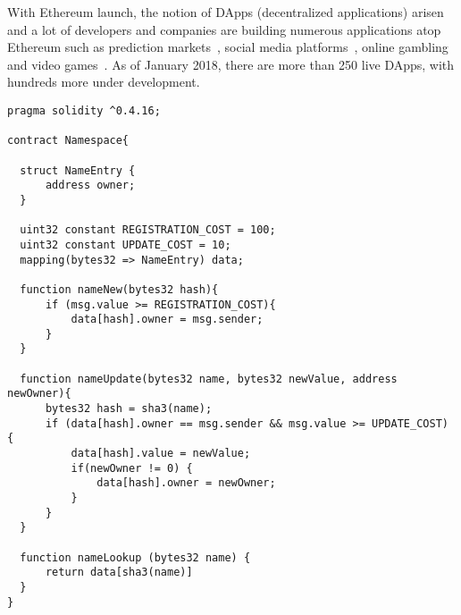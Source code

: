 With Ethereum launch, the notion of DApps (decentralized applications) arisen
and a lot of developers and companies are building numerous applications atop Ethereum such as prediction markets~\cite{augur,gnosis}, social media platforms~\cite{akasha,backfeed},
online gambling~\cite{etheroll,coinpoker} and video games~\cite{cryptokitties}. As of January 2018, there are more than 250 live DApps, with hundreds more under development.

\clearpage

\begin{lstlisting}[language=Solidity, caption={An Ethereum Smart Contract}]
pragma solidity ^0.4.16;

contract Namespace{

  struct NameEntry {
      address owner;
  }

  uint32 constant REGISTRATION_COST = 100;
  uint32 constant UPDATE_COST = 10;
  mapping(bytes32 => NameEntry) data;

  function nameNew(bytes32 hash){
      if (msg.value >= REGISTRATION_COST){
          data[hash].owner = msg.sender;
      }
  }

  function nameUpdate(bytes32 name, bytes32 newValue, address newOwner){
      bytes32 hash = sha3(name);
      if (data[hash].owner == msg.sender && msg.value >= UPDATE_COST) {
          data[hash].value = newValue;
          if(newOwner != 0) {
              data[hash].owner = newOwner;
          }
      }
  }

  function nameLookup (bytes32 name) {
      return data[sha3(name)]
  }
}
\end{lstlisting}

\clearpage
